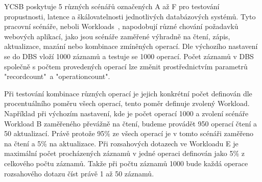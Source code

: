 \documentclass[czech,master,dept460,male,csharp,cpdeclaration]{diploma}
\begin{document}
	YCSB poskytuje 5 různých scénářů označených A až F pro testování propustnosti, latence a škálovatelnosti jednotlivých databázových systémů. Tyto pracovní scénáře, neboli Workloads~\cite{benchmark-pdf-1, workloads}, napodobují různé chování požadavků webových aplikací, jako jsou scénáře zaměřené výhradně na čtení, zápis, aktualizace, mazání nebo kombinace zmíněných operací. Dle výchozího nastavení se do DBS vloží 1000 záznamů a testuje se 1000 operací. Počet záznamů v DBS společně s počtem provedených operací lze změnit prostřednictvím parametrů "recordcount"~a "operationcount".
	
	Při testování kombinace různých operací je jejich konkrétní počet definován dle procentuálního poměru všech operací, tento poměr definuje zvolený Workload. Například při výchozím nastavení, kde je počet operací 1000 a zvolení scénáře Workload B zaměřeného převážně na čtení, budeme provádět 950 operací čtení a 50 aktualizací. Právě protože 95\% ze všech operací je v tomto scénáři zaměřeno na čtení a 5\% na aktualizace. Při rozsahových dotazech ve Workloadu E je maximální počet procházených záznamů v jedné operaci definován jako 5\% z celkového počtu záznamů. Takže při počtu záznamů 1000 bude každá operace rozsahového dotazu číst právě 1 až 50 záznamů.
	
\end{document}
